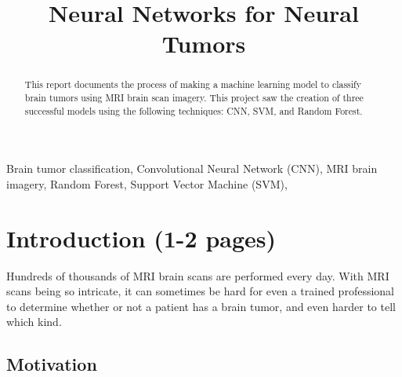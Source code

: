 \documentclass[conference]{IEEEtran}
\begin{document}
\title{Neural Networks for Neural Tumors}

\author{

\and
{}

\and
{}

\and
{}

\and
{}
}

\maketitle

\begin{abstract}
This report documents the process of making a machine learning model to classify brain tumors using MRI brain scan imagery. This project saw the creation of three successful models using the following techniques: CNN, SVM, and Random Forest. 
\end{abstract}

\begin{IEEEkeywords}
Brain tumor classification, Convolutional Neural Network (CNN), MRI brain imagery, Random Forest, Support Vector Machine (SVM), 
\end{IEEEkeywords}

\section{Introduction (1-2 pages)}
Hundreds of thousands of MRI brain scans are performed every day. With MRI scans being so intricate, it can sometimes be hard for even a trained professional to determine whether or not a patient has a brain tumor, and even harder to tell which kind. 

\subsection{Motivation}
\end{document}

